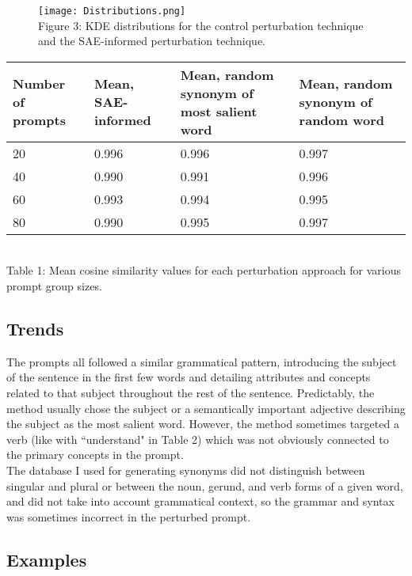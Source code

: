 \documentclass{article}
\begin{document}
\begin{figure} \centering
        \texttt{[image: Distributions.png]}
        \label{fig:Distributions.png}
        \centering
        \scriptsize
    \\Figure 3: KDE distributions for the control perturbation technique and the SAE-informed perturbation technique.
\end{figure}

\begin{center}
\begin{tabular}{|p{2cm} | p{4cm} | p{4cm} | p{4cm}|} 
 \hline
Number of prompts & Mean, SAE-informed & Mean, random synonym of most salient word & Mean, random synonym of random word \\
\hline
20 & 0.996 & 0.996 & 0.997 \\
\hline
40 & 0.990 & 0.991 & 0.996 \\
\hline
60 & 0.993 & 0.994 & 0.995 \\
\hline
80 & 0.990 & 0.995 & 0.997 \\
 \hline
\end{tabular}
\scriptsize
    \\ Table 1: Mean cosine similarity values for each perturbation approach for various prompt group sizes.
\end{center}

\subsection*{Trends}

The prompts all followed a similar grammatical pattern, introducing the subject of the sentence in the first few words and detailing attributes and concepts related to that subject throughout the rest of the sentence. Predictably, the method usually chose the subject or a semantically important adjective describing the subject as the most salient word. However, the method sometimes targeted a verb (like with ``understand" in Table 2) which was not obviously connected to the primary concepts in the prompt. \\ 

The database I used for generating synonyms did not distinguish between singular and plural or between the noun, gerund, and verb forms of a given word, and did not take into account grammatical context, so the grammar and syntax was sometimes incorrect in the perturbed prompt.

\subsection*{Examples}
\end{document}
